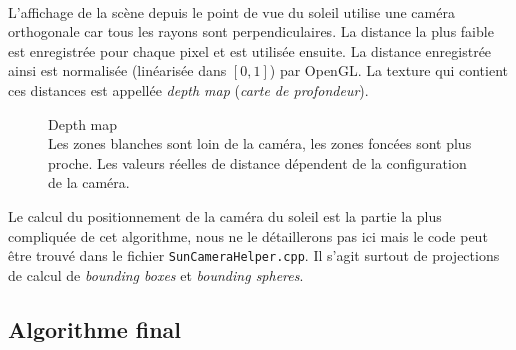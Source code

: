 \documentclass{EPUProjetDi}
\newcommand{\code}{\texttt}
\begin{document}
\paragraph{}
L'affichage de la scène depuis le point de vue du soleil utilise une caméra orthogonale car tous les rayons sont perpendiculaires. La distance la plus faible est enregistrée pour chaque pixel et est utilisée ensuite. La distance enregistrée ainsi est normalisée (linéarisée dans $[0,1]$) par OpenGL. La texture qui contient ces distances est appellée \textit{depth map} (\textit{carte de profondeur}).

\begin{figure}
	\centering
	\caption[Depth map]{Depth map\\Les zones blanches sont loin de la caméra, les zones foncées sont plus proche. Les valeurs réelles de distance dépendent de la configuration de la caméra.}
	\label{fig:sun_depth_map}
	\vspace{-10pt}
\end{figure}

Le calcul du positionnement de la caméra du soleil est la partie la plus compliquée de cet algorithme, nous ne le détaillerons pas ici mais le code peut être trouvé dans le fichier \code{SunCameraHelper.cpp}. Il s'agit surtout de projections de calcul de \textit{bounding boxes} et \textit{bounding spheres}.

\subsection{Algorithme final}
\end{document}

